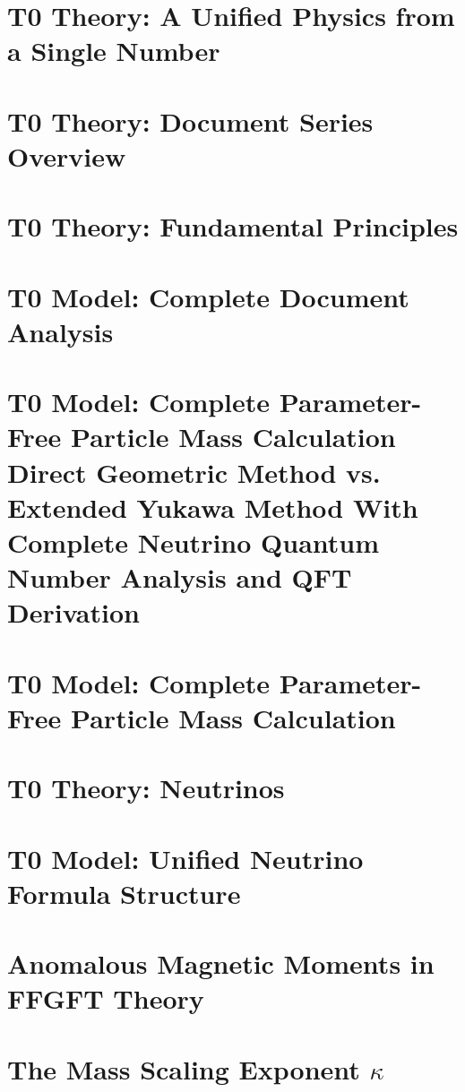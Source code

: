 \chapter{T0 Theory: A Unified Physics from a Single Number}

\chapter{T0 Theory: Document Series Overview}

\chapter{T0 Theory: Fundamental Principles}

\chapter{T0 Model: Complete Document Analysis}

\chapter{T0 Model: Complete Parameter-Free Particle Mass Calculation Direct Geometric Method vs. Extended Yukawa Method With Complete Neutrino Quantum Number Analysis and QFT Derivation}

\chapter{T0 Model: Complete Parameter-Free Particle Mass Calculation}

\chapter{T0 Theory: Neutrinos}

\chapter{T0 Model: Unified Neutrino Formula Structure}

\chapter{Anomalous Magnetic Moments in FFGFT Theory}

\chapter{The Mass Scaling Exponent $\kappa$}

